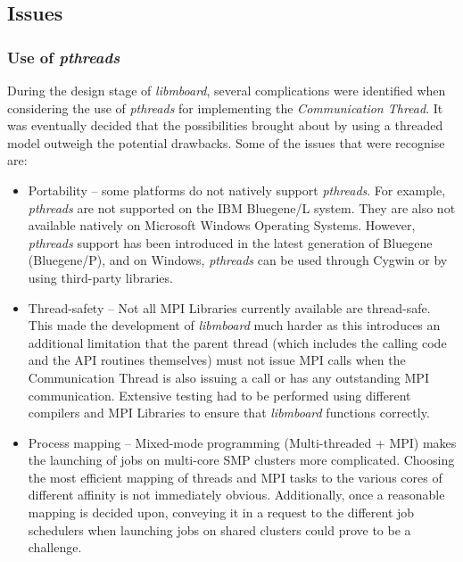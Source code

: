 \subsection{Issues}

\subsubsection{Use of \textit{pthreads}}

During the design stage of \textit{libmboard}, several complications were identified when considering the use of  \textit{pthreads} for implementing the \textit{Communication Thread}. It was eventually decided that the possibilities brought about by using a threaded model  outweigh the potential drawbacks. Some of the issues that were recognise are:
\begin{itemize}
\item Portability -- some platforms do not natively support \textit{pthreads}. For example, \textit{pthreads} are not supported on the IBM Bluegene/L system. They are also not available natively on Microsoft Windows Operating Systems. However, \textit{pthreads} support has been introduced in the latest generation of Bluegene (Bluegene/P), and on Windows, \textit{pthreads} can be used through Cygwin or by using third-party libraries.
\item Thread-safety -- Not all MPI Libraries currently available are thread-safe. This made the development of \textit{libmboard} much harder as this introduces an additional limitation that the parent thread (which includes the calling code and the API routines themselves) must not issue MPI calls when the Communication Thread is also issuing a call or has any outstanding MPI communication. Extensive testing had to be performed using different compilers and MPI Libraries to ensure that \textit{libmboard} functions correctly.
\item Process mapping -- Mixed-mode programming (Multi-threaded + MPI) makes the launching of jobs on multi-core SMP clusters more complicated. Choosing the most efficient mapping of threads and MPI tasks to the various cores of different affinity is not immediately obvious. Additionally, once a reasonable mapping is decided upon, conveying it in a request to the different job schedulers when launching jobs on shared clusters could prove to be a challenge.
\end{itemize} 

